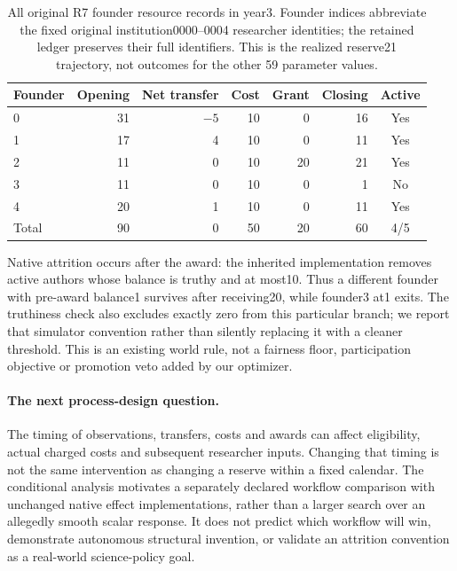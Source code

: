 \begin{table}[t]
\centering\small
\begin{tabular}{lrrrrrc}
\toprule
Founder & Opening & Net transfer & Cost & Grant & Closing & Active\\
\midrule
0&31&$-5$&10&0&16&Yes\\
1&17&4&10&0&11&Yes\\
2&11&0&10&20&21&Yes\\
3&11&0&10&0&1&No\\
4&20&1&10&0&11&Yes\\
\midrule
Total&90&0&50&20&60&4/5\\
\bottomrule
\end{tabular}
\caption{All original R7 founder resource records in year3. Founder indices
abbreviate the fixed original institution0000--0004 researcher identities;
the retained ledger preserves their full identifiers. This is the realized
reserve21 trajectory, not outcomes for the other 59 parameter values.}
\label{tab:native-reserve-ledger}
\end{table}

Native attrition occurs after the award: the inherited implementation removes
active authors whose balance is truthy and at most10. Thus a different founder
with pre-award balance1 survives after receiving20, while founder3 at1 exits.
The truthiness check also excludes exactly zero from this particular branch;
we report that simulator convention rather than silently replacing it with
a cleaner threshold. This is an existing world rule, not a fairness floor,
participation objective or promotion veto added by our optimizer.

\paragraph{The next process-design question.}
The timing of observations, transfers, costs and awards can affect eligibility,
actual charged costs and subsequent researcher inputs. Changing that timing
is not the same intervention as changing a reserve within a fixed calendar.
The conditional analysis motivates a separately declared workflow comparison
with unchanged native effect implementations, rather than a larger search
over an allegedly smooth scalar response. It does not predict which workflow
will win, demonstrate autonomous structural invention, or validate an attrition
convention as a real-world science-policy goal.
